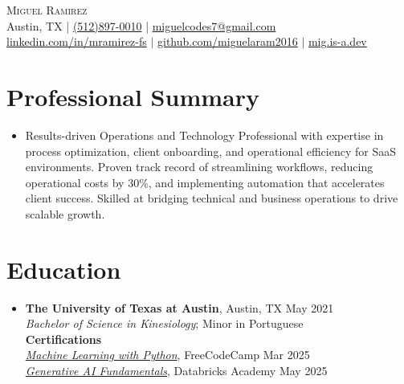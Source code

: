 \documentclass[letterpaper,10pt]{article}
\begin{document}
\begin{center}
  {\Large \scshape Miguel Ramirez} \\ \vspace{0pt}
  Austin, TX | \href{tel:+15128970010}{(512)897-0010} | \href{mailto:miguelcodes7@gmail.com}{miguelcodes7@gmail.com} \\ 
  \href{https://linkedin.com/in/mramirez-fs}{linkedin.com/in/mramirez-fs} $|$
  \href{https://github.com/miguelaram2016}{github.com/miguelaram2016} $|$
  \href{https://mig.is-a.dev}{mig.is-a.dev}
\end{center}

\section*{Professional Summary}
\begin{itemize}
  \item[]
    Results-driven Operations and Technology Professional with expertise in process optimization, client onboarding, and operational efficiency for SaaS environments. Proven track record of streamlining workflows, reducing operational costs by 30\%, and implementing automation that accelerates client success. Skilled at bridging technical and business operations to drive scalable growth.
\end{itemize}

\section*{Education}
\begin{itemize}
  \item[]
    \textbf{The University of Texas at Austin}, Austin, TX \hfill May 2021 \\
    \textit{Bachelor of Science in Kinesiology}; Minor in Portuguese \vspace{3pt} \\ 
    \textbf{Certifications} \\
    \textit{\href{https://www.freecodecamp.org/certification/migglenero/machine-learning-with-python-v7}{Machine Learning with Python}}, FreeCodeCamp \hfill Mar 2025 \\
    \textit{\href{https://credentials.databricks.com/052cc354-c947-42d8-81bb-40c38d77ace3\#acc.B2op0GxP}{Generative AI Fundamentals}}, Databricks Academy \hfill May 2025
\end{itemize}
\end{document}
